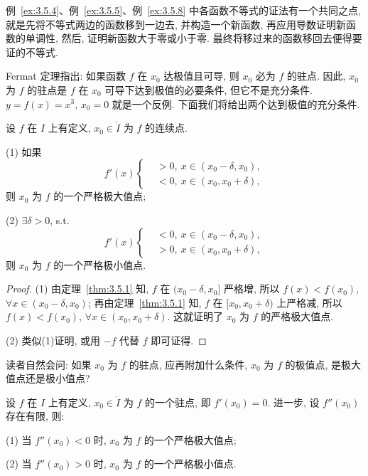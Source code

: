 \begin{remark}\label{rem:3.5.1}
例~\ref{ex:3.5.4}、例~\ref{ex:3.5.5}、例~\ref{ex:3.5.8} 中各函数不等式的证法有一个共同之点, 就是先将不等式两边的函数移到一边去, 并构造一个新函数, 再应用导数证明新函数的单调性, 然后, 证明新函数大于零或小于零. 最终将移过来的函数移回去便得要证的不等式.
\end{remark}

Fermat 定理指出: 如果函数 $f$ 在 $x_{0}$ 达极值且可导, 则 $x_{0}$ 必为 $f$ 的驻点. 因此, $x_{0}$ 为 $f$ 的驻点是 $f$ 在 $x_{0}$ 可导下达到极值的必要条件, 但它不是充分条件. $y=f(x)=x^{3}$, $x_{0}=0$ 就是一个反例. 下面我们将给出两个达到极值的充分条件.

\begin{theorem}[极值的充分条件之一]\label{thm:3.5.4}
设 $f$ 在 $I$ 上有定义, $x_{0}\in\mathring{I}$ 为 $f$ 的连续点.

(1) 如果
\[
f'(x)\left\{
\begin{aligned}
&>0,\ x\in(x_{0}-\delta,x_{0}),\\
&<0,\ x\in(x_{0},x_{0}+\delta),
\end{aligned}
\right.
\]
则 $x_{0}$ 为 $f$ 的一个严格极大值点;

(2) $\exists\delta>0$, s.t.
\[
f'(x)\left\{
\begin{aligned}
&<0,\ x\in(x_{0}-\delta,x_{0}),\\
&>0,\ x\in(x_{0},x_{0}+\delta),
\end{aligned}
\right.
\]
则 $x_{0}$ 为 $f$ 的一个严格极小值点.
\end{theorem}

\begin{proof}
(1) 由定理~\ref{thm:3.5.1} 知, $f$ 在 $(x_{0}-\delta,x_{0}]$ 严格增, 所以 $f(x)<f(x_{0})$, $\forall x\in(x_{0}-\delta,x_{0})$; 再由定理~\ref{thm:3.5.1} 知, $f$ 在 $[x_{0},x_{0}+\delta)$ 上严格减, 所以 $f(x)<f(x_{0})$, $\forall x\in(x_{0},x_{0}+\delta)$. 这就证明了 $x_{0}$ 为 $f$ 的严格极大值点.

(2) 类似(1)证明, 或用 $-f$ 代替 $f$ 即可证得.
\end{proof}

读者自然会问: 如果 $x_{0}$ 为 $f$ 的驻点, 应再附加什么条件, $x_{0}$ 为 $f$ 的极值点, 是极大值点还是极小值点?

\begin{theorem}[极值的充分条件二]\label{thm:3.5.5}
设 $f$ 在 $I$ 上有定义, $x_{0}\in\mathring{I}$ 为 $f$ 的一个驻点, 即 $f'(x_{0})=0$. 进一步, 设 $f''(x_{0})$ 存在有限, 则:

(1) 当 $f''(x_{0})<0$ 时, $x_{0}$ 为 $f$ 的一个严格极大值点;

(2) 当 $f''(x_{0})>0$ 时, $x_{0}$ 为 $f$ 的一个严格极小值点.
\end{theorem}

